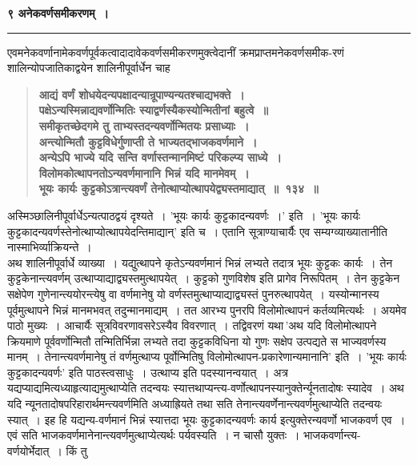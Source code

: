 \documentclass[11pt, openany]{book}
\begin{document}
\newpage
\thispagestyle{empty}

\begin{center}
\textbf{\large ९\; अनेकवर्णसमीकरणम्~।}\\
\rule{0.2\linewidth}{0.8pt}
\end{center}

\begin{sloppypar}
{\small एवमनेकवर्णानामेकवर्णपूर्वकत्वादादावेकवर्णसमीकरणमुक्त्वेदानीं क्रमप्राप्तमनेकवर्णसमीक-रणं शालिन्योपजातिकाद्वयेन शालिनीपूर्वार्धेन चाह\textendash }

 \label{9.134}
\begin{quote}
{\large \textbf{{\color{purple}आद्यं वर्णं शोधयेदन्यपक्षादन्यान्रूपाण्यन्यतश्चाद्यभक्ते~।\\
पक्षेऽन्यस्मिन्नाद्यवर्णोन्मितिः स्याद्वर्णस्यैकस्योन्मितीनां बहुत्वे~॥\\
समीकृतच्छेदगमे तु ताभ्यस्तदन्यवर्णोन्मितयः प्रसाध्याः~।\\
अन्त्योन्मितौ कुट्टविधेर्गुणाप्ती ते भाज्यतद्भाजकवर्णमाने~।\\
अन्येऽपि भाज्ये यदि सन्ति वर्णास्तन्मानमिष्टं परिकल्प्य साध्ये~।\\
विलोमकोत्थापनतोऽन्यवर्णमानानि भिन्नं यदि मानमेवम्~।\\
भूयः कार्यः कुट्टकोऽत्रान्त्यवर्णं तेनोत्थाप्योत्थापयेद्व्यस्तमाद्यात्~॥~१३४~॥}}}
\end{quote}

अस्मिञ्छालिनीपूर्वार्धेऽन्यत्पाठद्वयं दृश्यते~। 'भूयः कार्यः कुट्टकादन्यवर्णः~।' इति~। 'भूयः कार्यः कुट्टकादन्यवर्णस्तेनोत्थाप्योत्थापयेदन्तिमाद्यान्' इति च~। एतानि सूत्राण्याचार्यैः एव सम्यग्व्याख्यातानीति नास्माभिर्व्याक्रियन्ते~।\\

अथ शालिनीपूर्वार्धे व्याख्या~। यद्युत्थापने कृतेऽन्यवर्णमानं भिन्नं लभ्यते तदात्र भूयः कुट्टकः कार्यः~। तेन कुट्टकेनान्त्यवर्णम् उत्थाप्याद्याद्व्यस्तमुत्थापयेत्~। कुट्टको गुणविशेष इति प्रागेव निरूपितम्~। तेन कुट्टकेन सक्षेपेण गुणेनान्त्ययोरन्त्येषु वा वर्णमानेषु यो वर्णस्तमुत्थाप्याद्याद्व्यस्तं पुनरुत्थापयेत्~। यस्योन्मानस्य पूर्वमुत्थापने भिन्नं मानमभवत् तदुन्मानमाद्यम्~। तत आरभ्य पुनरपि विलोमोत्थापनं कर्तव्यमित्यर्थः~। अयमेव पाठो मुख्यः~। आचार्यैः सूत्रविवरणावसरेऽस्यैव विवरणात्~। तद्विवरणं यथा\textendash \,'अथ यदि विलोमोत्थापने क्रियमाणे पूर्ववर्णोन्मितौ तन्मितिर्भिन्ना लभ्यते तदा कुट्टकविधिना यो गुणः सक्षेप उत्पद्यते स भाज्यवर्णस्य मानम्~। तेनान्त्यवर्णमानेषु तं वर्णमुत्थाप्य पूर्वोन्मितिषु विलोमोत्थापन-प्रकारेणान्यमानानि' इति~। 'भूयः कार्यः कुट्टकादन्यवर्णः' इति पाठस्त्वसाधुः~। उत्थाप्य इति पदस्यानन्वयात्~। अत्र यद्यप्याद्यमित्यध्याहृत्याद्यमुत्थाप्येति तदन्वयः स्यात्तथाप्यन्त्य-वर्णोत्थापनस्यानुक्तेर्न्यूनतादोषः स्यादेव~। अथ यदि न्यूनतादोषपरिहारार्थमन्त्यवर्णमिति अध्याह्रियते तथा सति तेनान्त्यवर्णेनान्त्यवर्णमुत्थाप्येति तदन्वयः स्यात्~। इह हि यद्यन्य-वर्णमानं भिन्नं स्यात्तदा भूयः कुट्टकादन्यवर्णः कार्य इत्युक्तेरन्यवर्णो भाजकवर्ण एव~। एवं सति भाजकवर्णमानेनान्त्यवर्णमुत्थाप्येत्यर्थः पर्यवस्यति~। न चासौ युक्तः~। भाजकवर्णान्त्य-वर्णयोर्भेदात्~। किं तु
\end{sloppypar}
\end{document}
